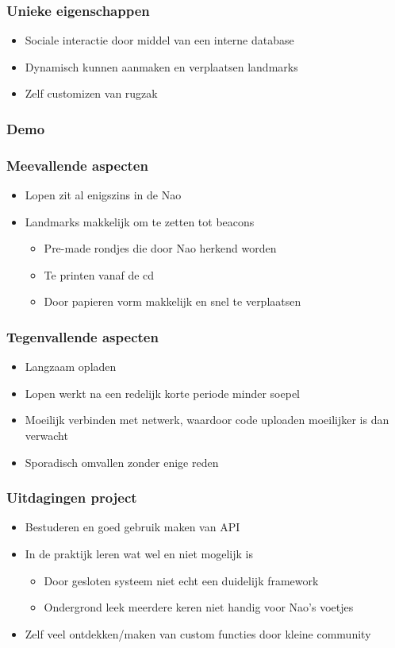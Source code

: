 \documentclass[]{beamerruhuisstijl}
\begin{document}
\begin{frame}
  \frametitle{Unieke eigenschappen}
  \begin{itemize}
    \item Sociale interactie door middel van een interne database
    \item Dynamisch kunnen aanmaken en verplaatsen landmarks
    \item Zelf customizen van rugzak
  \end{itemize}
\end{frame}

\begin{frame}
  \frametitle{Demo}
\end{frame}

\begin{frame}
  \frametitle{Meevallende aspecten}  
  \begin{itemize}
    \item Lopen zit al enigszins in de Nao
    \item Landmarks makkelijk om te zetten tot beacons
      \begin{itemize}
        \item Pre-made rondjes die door Nao herkend worden
        \item Te printen vanaf de cd
        \item Door papieren vorm makkelijk en snel te verplaatsen
      \end{itemize}
  \end{itemize}
\end{frame}

\begin{frame}
  \frametitle{Tegenvallende aspecten}  
  \begin{itemize}
    \item Langzaam opladen
    \item Lopen werkt na een redelijk korte periode minder soepel
    \item Moeilijk verbinden met netwerk, waardoor code uploaden moeilijker is dan verwacht
    \item Sporadisch omvallen zonder enige reden
  \end{itemize}
\end{frame}


\begin{frame}
  \frametitle{Uitdagingen project}  
  \begin{itemize}
    \item Bestuderen en goed gebruik maken van API
    \item In de praktijk leren wat wel en niet mogelijk is
      \begin{itemize}
        \item Door gesloten systeem niet echt een duidelijk framework
        \item Ondergrond leek meerdere keren niet handig voor Nao's voetjes
      \end{itemize}
    \item Zelf veel ontdekken/maken van custom functies door kleine community
  \end{itemize}
\end{frame}
\end{document}
